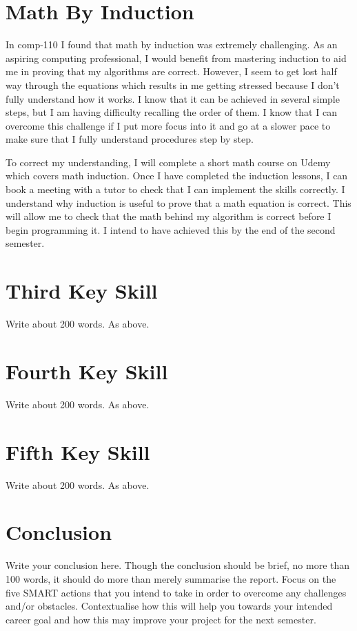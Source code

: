 \documentclass{scrartcl}
\begin{document}
\section{Math By Induction}

In comp-110 I found that math by induction was extremely challenging. As an aspiring computing professional, I would benefit from mastering induction to aid me in proving that my algorithms are correct. However, I seem to get lost half way through the equations which results in me getting stressed because I don’t fully understand how it works. I know that it can be achieved in several simple steps, but I am having difficulty recalling the order of them. I know that I can overcome this challenge if I put more focus into it and go at a slower pace to make sure that I fully understand procedures step by step.

To correct my understanding, I will complete a short math course on Udemy \cite{Udemy} which covers math induction. Once I have completed the induction lessons, I can book a meeting with a tutor to check that I can implement the skills correctly. I understand why induction is useful to prove that a math equation is correct. This will allow me to check that the math behind my algorithm is correct before I begin programming it. I intend to have achieved this by the end of the second semester. 

\section{Third Key Skill}

Write about 200 words. As above.

\section{Fourth Key Skill}

Write about 200 words. As above.

\section{Fifth Key Skill}

Write about 200 words. As above.

\section{Conclusion}

Write your conclusion here. Though the conclusion should be brief, no more than 100 words, it should do more than merely summarise the report. Focus on the five SMART actions that you intend to take in order to overcome any challenges and/or obstacles. Contextualise how this will help you towards your intended career goal and how this may improve your project for the next semester.



\end{document}
